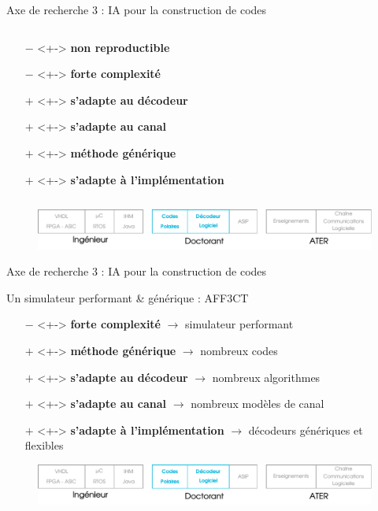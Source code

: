 \documentclass[t,compress,mathserif,12pt,xcolor=dvipsnames]{beamer}
\newcommand{\RED} [1]{\textcolor{Paired-5}{\textbf{#1}}}
\newcommand{\GREEN} [1]{\textcolor{Paired-3}{\textbf{#1}}}
\begin{document}
\begin{frame}[t]{Axe de recherche 3 : IA pour la construction de codes}
\begin{minipage}[t][5.0cm][t]{\textwidth}
\begin{columns}[T]
\begin{column}{0.45\textwidth}
{\begin{itemize}
          \setlength\itemsep{-0.5em}
          \item[\RED{$-$}]  <+-> \RED  {non reproductible}
          \item[\RED{$-$}]  <+-> \RED  {forte complexité}
          \item[\GREEN{$+$}]<+-> \GREEN{s'adapte au décodeur}
          \item[\GREEN{$+$}]<+-> \GREEN{s'adapte au canal}
          \item[\GREEN{$+$}]<+-> \GREEN{méthode générique}
          \item[\GREEN{$+$}]<+-> \GREEN{s'adapte à l'implémentation}
        \end{itemize}
        }
      \end{column}
    \end{columns}
  \end{minipage}
  \begin{figure}[htp]
    \centering
    \includegraphics[width=\textwidth]{fig/frise24}
  \end{figure}
\end{frame}


\begin{frame}[t]{Axe de recherche 3 : IA pour la construction de codes}
  \begin{minipage}[t][5.0cm][t]{\textwidth}
    \begin{center}
      Un simulateur performant \& générique : AFF3CT
    \end{center}
    \begin{itemize}
      \item[\RED{$-$}]  <+-> \RED  {forte complexité} $\rightarrow$ simulateur performant
      \item[\GREEN{$+$}]<+-> \GREEN{méthode générique} $\rightarrow$ nombreux codes
      \item[\GREEN{$+$}]<+-> \GREEN{s'adapte au décodeur} $\rightarrow$ nombreux algorithmes
      \item[\GREEN{$+$}]<+-> \GREEN{s'adapte au canal} $\rightarrow$ nombreux modèles de canal
      \item[\GREEN{$+$}]<+-> \GREEN{s'adapte à l'implémentation} $\rightarrow$ décodeurs génériques et flexibles
    \end{itemize}
\end{minipage}
\begin{figure}[htp]
  \centering
  \includegraphics[width=\textwidth]{fig/frise24}
\end{figure}
\end{frame}
\end{document}
